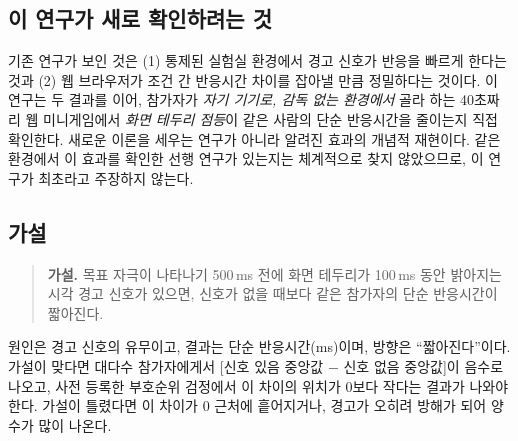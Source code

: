 \subsection{이 연구가 새로 확인하려는 것}
기존 연구가 보인 것은 (1) 통제된 실험실 환경에서 경고 신호가 반응을 빠르게 한다는 것과
(2) 웹 브라우저가 조건 간 반응시간 차이를 잡아낼 만큼 정밀하다는 것이다.
이 연구는 두 결과를 이어, 참가자가 \emph{자기 기기로, 감독 없는 환경에서} 골라 하는 40초짜리 웹 미니게임에서
\emph{화면 테두리 점등}이 같은 사람의 단순 반응시간을 줄이는지 직접 확인한다.
새로운 이론을 세우는 연구가 아니라 알려진 효과의 개념적 재현이다.
같은 환경에서 이 효과를 확인한 선행 연구가 있는지는 체계적으로 찾지 않았으므로, 이 연구가 최초라고 주장하지 않는다.

\subsection{가설}
\begin{quote}
\textbf{가설.} 목표 자극이 나타나기 500\,ms 전에 화면 테두리가 100\,ms 동안 밝아지는 시각 경고 신호가 있으면,
신호가 없을 때보다 같은 참가자의 단순 반응시간이 짧아진다.
\end{quote}
원인은 경고 신호의 유무이고, 결과는 단순 반응시간(ms)이며, 방향은 ``짧아진다''이다.
가설이 맞다면 대다수 참가자에게서 [신호 있음 중앙값 $-$ 신호 없음 중앙값]이 음수로 나오고,
사전 등록한 부호순위 검정에서 이 차이의 위치가 0보다 작다는 결과가 나와야 한다.
가설이 틀렸다면 이 차이가 0 근처에 흩어지거나, 경고가 오히려 방해가 되어 양수가 많이 나온다.
